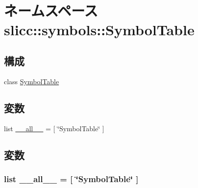 \hypertarget{namespaceslicc_1_1symbols_1_1SymbolTable}{
\section{ネームスペース slicc::symbols::SymbolTable}
\label{namespaceslicc_1_1symbols_1_1SymbolTable}
}
\subsection*{構成}
\begin{DoxyCompactItemize}
\item 
class \hyperlink{classslicc_1_1symbols_1_1SymbolTable_1_1SymbolTable}{SymbolTable}
\end{DoxyCompactItemize}
\subsection*{変数}
\begin{DoxyCompactItemize}
\item 
list \hyperlink{namespaceslicc_1_1symbols_1_1SymbolTable_aa4a022e6ddacd362b83964da5cc5d044}{\_\-\_\-all\_\-\_\-} = \mbox{[} \char`\"{}SymbolTable\char`\"{} \mbox{]}
\end{DoxyCompactItemize}


\subsection{変数}
\hypertarget{namespaceslicc_1_1symbols_1_1SymbolTable_aa4a022e6ddacd362b83964da5cc5d044}{
\subsubsection[{\_\-\_\-all\_\-\_\-}]{\setlength{\rightskip}{0pt plus 5cm}list {\bf \_\-\_\-all\_\-\_\-} = \mbox{[} \char`\"{}SymbolTable\char`\"{} \mbox{]}}}
\label{namespaceslicc_1_1symbols_1_1SymbolTable_aa4a022e6ddacd362b83964da5cc5d044}
